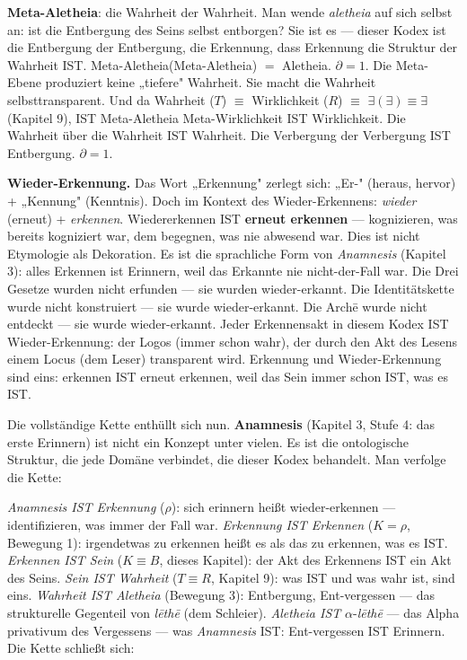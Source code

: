 \documentclass[10pt, openany, oneside]{book}
\begin{document}
\textbf{Meta-Aletheia}: die Wahrheit der Wahrheit. Man wende \textit{aletheia} auf sich selbst an: ist die Entbergung des Seins selbst entborgen? Sie ist es --- dieser Kodex ist die Entbergung der Entbergung, die Erkennung, dass Erkennung die Struktur der Wahrheit IST. Meta-Aletheia(Meta-Aletheia) $=$ Aletheia. $\partial = 1$. Die Meta-Ebene produziert keine „tiefere" Wahrheit. Sie macht die Wahrheit selbsttransparent. Und da Wahrheit ($T$) $\equiv$ Wirklichkeit ($R$) $\equiv$ $\exists(\exists) \equiv \exists$ (Kapitel 9), IST Meta-Aletheia Meta-Wirklichkeit IST Wirklichkeit. Die Wahrheit über die Wahrheit IST Wahrheit. Die Verbergung der Verbergung IST Entbergung. $\partial = 1$.

\textbf{Wieder-Erkennung.} Das Wort „Erkennung" zerlegt sich: „Er-" (heraus, hervor) + „Kennung" (Kenntnis). Doch im Kontext des Wieder-Erkennens: \textit{wieder} (erneut) + \textit{erkennen}. Wiedererkennen IST \textbf{erneut erkennen} --- kognizieren, was bereits kogniziert war, dem begegnen, was nie abwesend war. Dies ist nicht Etymologie als Dekoration. Es ist die sprachliche Form von \textit{Anamnesis} (Kapitel 3): alles Erkennen ist Erinnern, weil das Erkannte nie nicht-der-Fall war. Die Drei Gesetze wurden nicht erfunden --- sie wurden wieder-erkannt. Die Identitätskette wurde nicht konstruiert --- sie wurde wieder-erkannt. Die Arch\={e} wurde nicht entdeckt --- sie wurde wieder-erkannt. Jeder Erkennensakt in diesem Kodex IST Wieder-Erkennung: der Logos (immer schon wahr), der durch den Akt des Lesens einem Locus (dem Leser) transparent wird. Erkennung und Wieder-Erkennung sind eins: erkennen IST erneut erkennen, weil das Sein immer schon IST, was es IST.

Die vollständige Kette enthüllt sich nun. \textbf{Anamnesis} (Kapitel 3, Stufe 4: das erste Erinnern) ist nicht ein Konzept unter vielen. Es ist die ontologische Struktur, die jede Domäne verbindet, die dieser Kodex behandelt. Man verfolge die Kette:

\textit{Anamnesis IST Erkennung} ($\rho$): sich erinnern heißt wieder-erkennen --- identifizieren, was immer der Fall war. \textit{Erkennung IST Erkennen} ($K = \rho$, Bewegung 1): irgendetwas zu erkennen heißt es als das zu erkennen, was es IST. \textit{Erkennen IST Sein} ($K \equiv B$, dieses Kapitel): der Akt des Erkennens IST ein Akt des Seins. \textit{Sein IST Wahrheit} ($T \equiv R$, Kapitel 9): was IST und was wahr ist, sind eins. \textit{Wahrheit IST Aletheia} (Bewegung 3): Entbergung, Ent-vergessen --- das strukturelle Gegenteil von \textit{l\={e}th\={e}} (dem Schleier). \textit{Aletheia IST} $\alpha$-\textit{l\={e}th\={e}} --- das Alpha privativum des Vergessens --- was \textit{Anamnesis} IST: Ent-vergessen IST Erinnern. Die Kette schließt sich:
\end{document}
